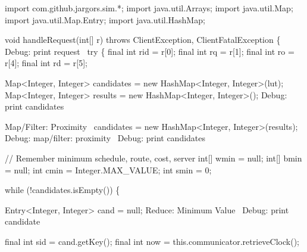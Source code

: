 \nwenddocs{}\endmoddef\nwstartdeflinemarkup{}\nwenddeflinemarkup
import com.github.jargors.sim.*;
import java.util.Arrays;
import java.util.Map;
import java.util.Map.Entry;
import java.util.HashMap;
\nwendcode{}\nwdocspar

\nwenddocs{}\endmoddef\nwstartdeflinemarkup{}\nwenddeflinemarkup
void handleRequest(int[] r) throws ClientException, ClientFatalException \{
  \LA{}Debug: print request~{\nwtagstyle{}}\RA{}
  try \{
    final int rid = r[0];
    final int rq  = r[1];
    final int ro  = r[4];
    final int rd  = r[5];

    Map<Integer, Integer> candidates = new HashMap<Integer, Integer>(lut);
    Map<Integer, Integer> results = new HashMap<Integer, Integer>();
    \LA{}Debug: print candidates~{\nwtagstyle{}}\RA{}

    \LA{}Map/Filter: Proximity~{\nwtagstyle{}}\RA{}
    candidates = new HashMap<Integer, Integer>(results);
    \LA{}Debug: map/filter: proximity~{\nwtagstyle{}}\RA{}
    \LA{}Debug: print candidates~{\nwtagstyle{}}\RA{}

    // Remember minimum schedule, route, cost, server
    int[] wmin = null;
    int[] bmin = null;
    int cmin = Integer.MAX_VALUE;
    int smin = 0;

    while (!candidates.isEmpty()) \{

      Entry<Integer, Integer> cand = null;
      \LA{}Reduce: Minimum Value~{\nwtagstyle{}}\RA{}
      \LA{}Debug: print candidate~{\nwtagstyle{}}\RA{}

      final int sid = cand.getKey();
      final int now = this.communicator.retrieveClock();

